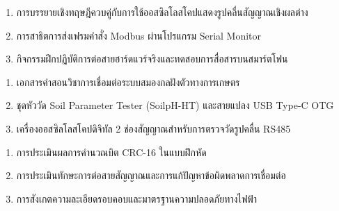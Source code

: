 \begin{tcolorbox}[
    enhanced, breakable,
    colback=white, colframe=rbruNavy,
    fonttitle=\bfseries\color{white},
    title={3. วิธีสอนและกิจกรรมการเรียนการสอน},
    arc=1.5mm, boxrule=0.8pt, leftrule=3.5mm
]
\begin{enumerate}
    \item การบรรยายเชิงทฤษฎีควบคู่กับการใช้ออสซิลโลสโคปแสดงรูปคลื่นสัญญาณเชิงผลต่าง
    \item การสาธิตการส่งเฟรมคำสั่ง Modbus ผ่านโปรแกรม Serial Monitor
    \item กิจกรรมฝึกปฏิบัติการต่อสายฮาร์ดแวร์จริงและทดสอบการสื่อสารบนสมาร์ตโฟน
\end{enumerate}
\end{tcolorbox}

\begin{tcolorbox}[
    enhanced, breakable,
    colback=white, colframe=rbruNavy,
    fonttitle=\bfseries\color{white},
    title={4. สื่อการเรียนการสอน},
    arc=1.5mm, boxrule=0.8pt, leftrule=3.5mm
]
\begin{enumerate}
    \item เอกสารคำสอนวิชาการเชื่อมต่อระบบสมองกลฝังตัวทางการเกษตร
    \item ชุดหัววัด Soil Parameter Tester (SoilpH-HT) และสายแปลง USB Type-C OTG
    \item เครื่องออสซิลโลสโคปดิจิทัล 2 ช่องสัญญาณสำหรับการตรวจวัดรูปคลื่น RS485
\end{enumerate}
\end{tcolorbox}

\begin{tcolorbox}[
    enhanced, breakable,
    colback=white, colframe=rbruNavy,
    fonttitle=\bfseries\color{white},
    title={5. การวัดและประเมินผล},
    arc=1.5mm, boxrule=0.8pt, leftrule=3.5mm
]
\begin{enumerate}
    \item การประเมินผลการคำนวณบิต CRC-16 ในแบบฝึกหัด
    \item การประเมินทักษะการต่อสายสัญญาณและการแก้ปัญหาข้อผิดพลาดการเชื่อมต่อ
    \item การสังเกตความละเอียดรอบคอบและมาตรฐานความปลอดภัยทางไฟฟ้า
\end{enumerate}
\end{tcolorbox}

\clearpage

